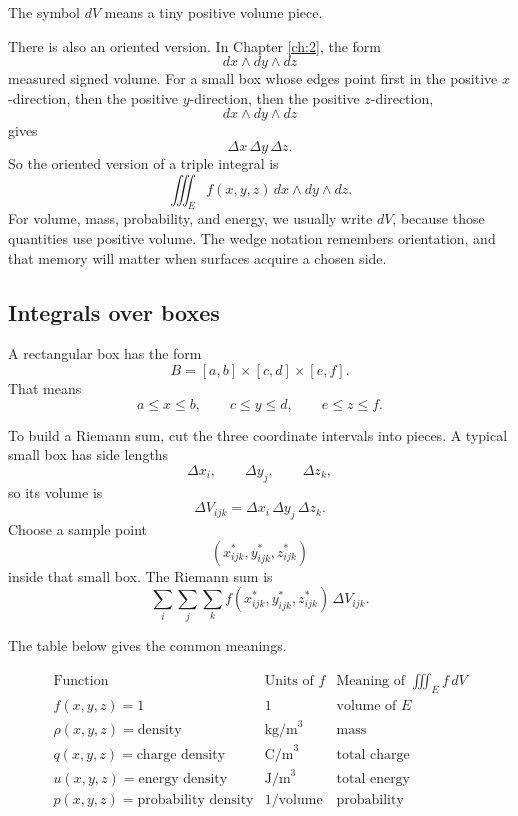 The symbol \(dV\) means a tiny positive volume piece.

There is also an oriented version.  In Chapter \ref{ch:2}, the form
\[
    dx\wedge dy\wedge dz
\]
measured signed volume.  For a small box whose edges point first in the positive
\(x\)-direction, then the positive \(y\)-direction, then the positive \(z\)-direction,
\[
    dx\wedge dy\wedge dz
\]
gives
\[
    \Delta x\,\Delta y\,\Delta z.
\]
So the oriented version of a triple integral is
\[
\boxed{
    \iiint_E f(x,y,z)\,dx\wedge dy\wedge dz.
}
\]
For volume, mass, probability, and energy, we usually write \(dV\), because those
quantities use positive volume.  The wedge notation remembers orientation, and that
memory will matter when surfaces acquire a chosen side.

\subsection{Integrals over boxes}

A rectangular box has the form
\[
    B=[a,b]\times[c,d]\times[e,f].
\]
That means
\[
    a\le x\le b,\qquad c\le y\le d,\qquad e\le z\le f.
\]

To build a Riemann sum, cut the three coordinate intervals into pieces.  A typical
small box has side lengths
\[
    \Delta x_i,\qquad \Delta y_j,\qquad \Delta z_k,
\]
so its volume is
\[
    \Delta V_{ijk}
    =
    \Delta x_i\,\Delta y_j\,\Delta z_k.
\]
Choose a sample point
\[
    (x_{ijk}^*,y_{ijk}^*,z_{ijk}^*)
\]
inside that small box.  The Riemann sum is
\[
\boxed{
    \sum_i\sum_j\sum_k
    f(x_{ijk}^*,y_{ijk}^*,z_{ijk}^*)\,
    \Delta V_{ijk}.
}
\]

The table below gives the common meanings.

\[
\begin{array}{c|c|c}
\text{Function} & \text{Units of } f & \text{Meaning of } \displaystyle\iiint_E f\,dV \\ \hline
f(x,y,z)=1 & 1 & \text{volume of }E\\[1mm]
\rho(x,y,z)=\text{density} & \text{kg/m}^3 & \text{mass}\\[1mm]
q(x,y,z)=\text{charge density} & \text{C/m}^3 & \text{total charge}\\[1mm]
u(x,y,z)=\text{energy density} & \text{J/m}^3 & \text{total energy}\\[1mm]
p(x,y,z)=\text{probability density} & 1/\text{volume} & \text{probability}
\end{array}
\]

